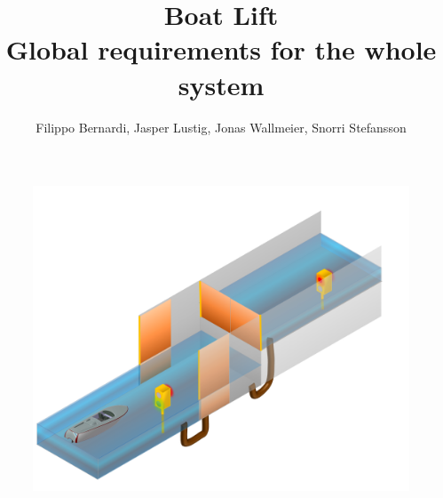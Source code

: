 \documentclass{article}
\begin{document}
\title{\huge{Boat Lift} \\ {\fontsize{13}{1} \selectfont Global requirements for the whole system} }
\author{Filippo Bernardi, Jasper Lustig, Jonas Wallmeier, Snorri Stefansson}

\maketitle



\begin{figure}[!h]
	\includegraphics[width=\linewidth]{New}
\end{figure}

\pagebreak

%






\end{document}

